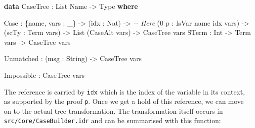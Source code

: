 \documentclass[
]{article}
\newenvironment{Shaded}{}{}
\newcommand{\CommentTok}[1]{\textcolor[rgb]{0.38,0.63,0.69}{\textit{#1}}}
\newcommand{\DataTypeTok}[1]{\textcolor[rgb]{0.56,0.13,0.00}{#1}}
\newcommand{\DecValTok}[1]{\textcolor[rgb]{0.25,0.63,0.44}{#1}}
\newcommand{\KeywordTok}[1]{\textcolor[rgb]{0.00,0.44,0.13}{\textbf{#1}}}
\newcommand{\NormalTok}[1]{#1}
\newcommand{\OperatorTok}[1]{\textcolor[rgb]{0.40,0.40,0.40}{#1}}
\newcommand{\OtherTok}[1]{\textcolor[rgb]{0.00,0.44,0.13}{#1}}
\begin{document}
\begin{Shaded}
\begin{Highlighting}[]
  \KeywordTok{data} \DataTypeTok{CaseTree} \OperatorTok{:} \DataTypeTok{List} \DataTypeTok{Name} \OtherTok{{-}\textgreater{}} \DataTypeTok{Type} \KeywordTok{where}

       \DataTypeTok{Case} \OperatorTok{:}\NormalTok{ \{name, vars }\OperatorTok{:}\NormalTok{ \_\} }\OtherTok{{-}\textgreater{}}
\NormalTok{              (idx }\OperatorTok{:} \DataTypeTok{Nat}\NormalTok{) }\OtherTok{{-}\textgreater{}} \CommentTok{{-}{-} Here}
\NormalTok{              (}\DecValTok{0}\NormalTok{ p }\OperatorTok{:} \DataTypeTok{IsVar}\NormalTok{ name idx vars) }\OtherTok{{-}\textgreater{}}
\NormalTok{              (scTy }\OperatorTok{:} \DataTypeTok{Term}\NormalTok{ vars) }\OtherTok{{-}\textgreater{}} \DataTypeTok{List}\NormalTok{ (}\DataTypeTok{CaseAlt}\NormalTok{ vars) }\OtherTok{{-}\textgreater{}}
              \DataTypeTok{CaseTree}\NormalTok{ vars}
       \DataTypeTok{STerm} \OperatorTok{:} \DataTypeTok{Int} \OtherTok{{-}\textgreater{}} \DataTypeTok{Term}\NormalTok{ vars }\OtherTok{{-}\textgreater{}} \DataTypeTok{CaseTree}\NormalTok{ vars}

       \DataTypeTok{Unmatched} \OperatorTok{:}\NormalTok{ (msg }\OperatorTok{:} \DataTypeTok{String}\NormalTok{) }\OtherTok{{-}\textgreater{}} \DataTypeTok{CaseTree}\NormalTok{ vars}

       \DataTypeTok{Impossible} \OperatorTok{:} \DataTypeTok{CaseTree}\NormalTok{ vars}
\end{Highlighting}
\end{Shaded}

The reference is carried by \texttt{idx} which is the index of the
variable in its context, as supported by the proof \texttt{p}. Once we
get a hold of this reference, we can move on to the actual tree
transformation. The transformation itself occurs in
\texttt{src/Core/CaseBuilder.idr} and can be summarised with this
function:
\end{document}
